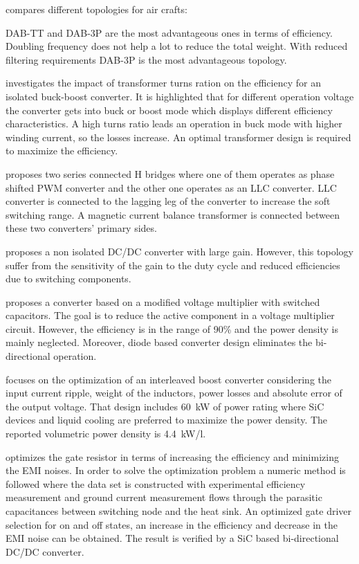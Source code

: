 \documentclass[energies,article,submit,moreauthors,pdftex]{Definitions/mdpi}
\begin{document}
\cite{Ojeda-Rodriguez2020} compares different topologies for air crafts:

DAB-TT and DAB-3P are the most advantageous ones in terms of efficiency. Doubling frequency does not help a lot to reduce the total weight. With reduced filtering requirements DAB-3P is the most advantageous topology.

\cite{MashinchiMaheri2020} investigates the impact of transformer turns ration on the efficiency for an isolated buck-boost converter. It is highlighted that for different operation voltage the converter gets into buck or boost mode which displays different efficiency characteristics. A high turns ratio leads an operation in buck mode with higher winding current, so the losses increase. An optimal transformer design is required to maximize the efficiency.

\cite{Lin2017} proposes two series connected H bridges where one of them operates as phase shifted PWM converter and the other one operates as an LLC converter. LLC converter is connected to the lagging leg of the converter to increase the soft switching range. A magnetic current balance transformer is connected between these two converters' primary sides.

\cite{Chen2020} proposes a non isolated DC/DC converter with large gain. However, this topology suffer from the sensitivity of the gain to the duty cycle and reduced efficiencies due to switching components.

\cite{Stala2020} proposes a converter based on a modified voltage multiplier with switched capacitors. The goal is to reduce the active component in a voltage multiplier circuit. However, the efficiency is in the range of 90\% and the power density is mainly neglected. Moreover, diode based converter design eliminates the bi-directional operation.

\cite{Tran2020} focuses on the optimization of an interleaved boost converter considering the input current ripple, weight of the inductors, power losses and absolute error of the output voltage. That design includes 60~kW of power rating where SiC devices and liquid cooling are preferred to maximize the power density. The reported volumetric power density is 4.4~kW/l.

\cite{Moradpour2020} optimizes the gate resistor in terms of increasing the efficiency and minimizing the EMI noises. In order to solve the optimization problem a numeric method is followed where the data set is constructed with experimental efficiency measurement and ground current measurement flows through the parasitic capacitances between switching node and the heat sink. An optimized gate driver selection for on and off states, an increase in the efficiency and decrease in the EMI noise can be obtained. The result is verified by a SiC based bi-directional DC/DC converter.
\end{document}

